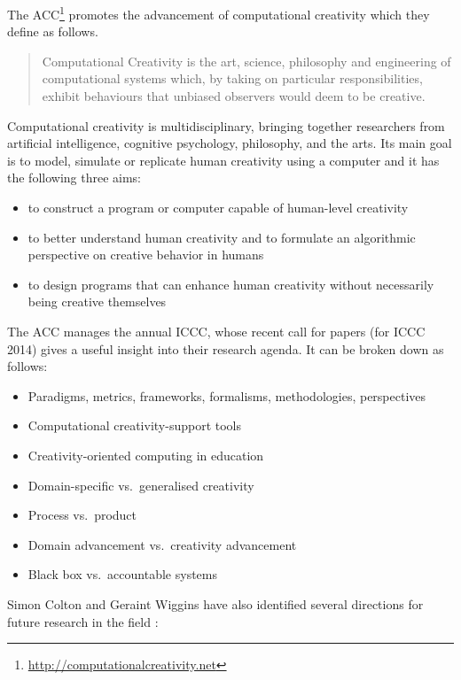 The \ac{ACC}\footnote{\url{http://computationalcreativity.net}} promotes the advancement of computational creativity which they define as follows.

\begin{quotation}
  Computational Creativity is the art, science, philosophy and engineering of computational systems which, by taking on particular responsibilities, exhibit behaviours that unbiased observers would deem to be creative. 
\end{quotation}

Computational creativity is multidisciplinary, bringing together researchers from artificial intelligence, cognitive psychology, philosophy, and the arts.  Its main goal is to model, simulate or replicate human creativity using a computer and it has the following three aims:

\begin{itemize}
  \item to construct a program or computer capable of human-level creativity
  \item to better understand human creativity and to formulate an algorithmic perspective on creative behavior in humans
  \item to design programs that can enhance human creativity without necessarily being creative themselves
\end{itemize}

The \ac{ACC} manages the annual \ac{ICCC}, whose recent call for papers (for \ac{ICCC} 2014) gives a useful insight into their research agenda. It can be broken down as follows:

\begin{itemize}
  \item Paradigms, metrics, frameworks, formalisms, methodologies, perspectives
  \item Computational creativity-support tools
  \item Creativity-oriented computing in education
  \item Domain-specific vs.\ generalised creativity
  \item Process vs.\ product
  \item Domain advancement vs.\ creativity advancement
  \item Black box vs.\ accountable systems
\end{itemize}

Simon Colton and Geraint Wiggins have also identified several directions for future research in the field \citeyear[p.5]{Colton2012}:

